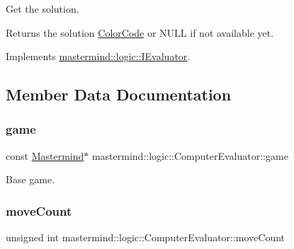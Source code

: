 Get the solution. 

\begin{DoxyReturn}{Returns}
the solution \hyperlink{classmastermind_1_1logic_1_1_color_code}{Color\+Code} or N\+U\+LL if not available yet. 
\end{DoxyReturn}


Implements \hyperlink{classmastermind_1_1logic_1_1_i_evaluator_a544ecf5ba1d2cb5708e62fc508d341f3}{mastermind\+::logic\+::\+I\+Evaluator}.



\subsection{Member Data Documentation}
\hypertarget{classmastermind_1_1logic_1_1_computer_evaluator_a8801ded4db90b5feae19e6d521738311}{}\label{classmastermind_1_1logic_1_1_computer_evaluator_a8801ded4db90b5feae19e6d521738311} 
\subsubsection{\texorpdfstring{game}{game}}
{\footnotesize\ttfamily const \hyperlink{classmastermind_1_1logic_1_1_mastermind}{Mastermind}$\ast$ mastermind\+::logic\+::\+Computer\+Evaluator\+::game\hspace{0.3cm}{\ttfamily [private]}}



Base game. 

\hypertarget{classmastermind_1_1logic_1_1_computer_evaluator_afc73806d239bdc6c9df603850d309982}{}\label{classmastermind_1_1logic_1_1_computer_evaluator_afc73806d239bdc6c9df603850d309982} 
\subsubsection{\texorpdfstring{move\+Count}{moveCount}}
{\footnotesize\ttfamily unsigned int mastermind\+::logic\+::\+Computer\+Evaluator\+::move\+Count\hspace{0.3cm}{\ttfamily [private]}}



